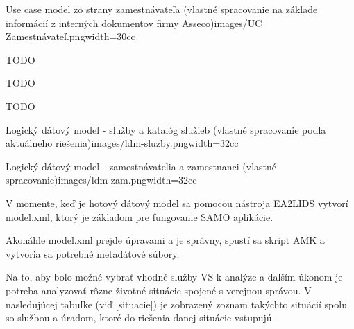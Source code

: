 {Use case model zo strany zamestnávateľa (vlastné spracovanie na základe informácií z interných dokumentov firmy Asseco)}{images/UC Zamestnávateľ.png}{width=30cc}


\TODO
TODO


\TODO
TODO


\TODO 
TODO


{Logický dátový model - služby a katalóg služieb (vlastné spracovanie podľa aktuálneho riešenia)}{images/ldm-sluzby.png}{width=32cc}

{Logický dátový model - zamestnávatelia a zamestnanci (vlastné spracovanie)}{images/ldm-zam.png}{width=32cc}

V momente, keď je hotový dátový model sa pomocou nástroja EA2LIDS vytvorí model.xml, ktorý je základom pre fungovanie SAMO aplikácie. 

Akonáhle model.xml prejde úpravami a je správny, spustí sa skript AMK a vytvoria sa potrebné metadátové súbory. 

Na to, aby bolo možné vybrať vhodné služby VS k analýze a ďalším úkonom je potreba analyzovať rôzne životné situácie spojené s verejnou správou. V nasledujúcej tabuľke (viď [situacie]) je zobrazený zoznam takýchto situácií spolu so službou a úradom, ktoré do riešenia danej situácie vstupujú.


  \setupTABLE[column][1][width=12cc]
  \setupTABLE[column][2][width=8cc]
  \setupTABLE[column][3][width=16cc]
  \setupTABLE[r][each][align={middle,lohi}]

